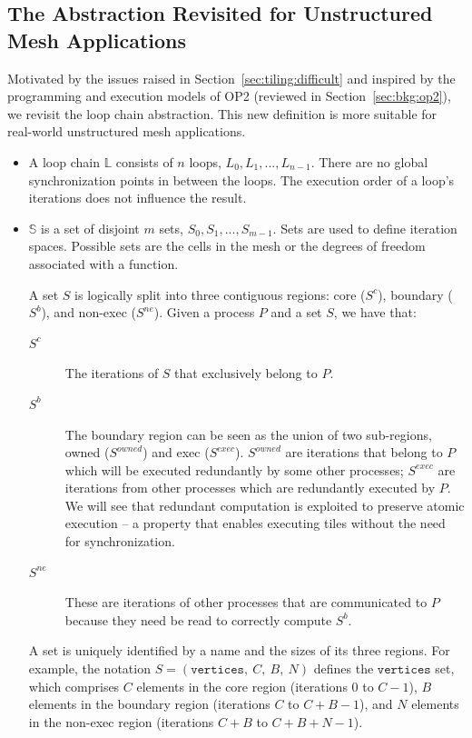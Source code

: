 \subsection{The Abstraction Revisited for Unstructured Mesh Applications}
\label{sec:tiling:lc-unstruct}
Motivated by the issues raised in Section~\ref{sec:tiling:difficult} and inspired by the programming and execution models of OP2 (reviewed in Section~\ref{sec:bkg:op2}), we revisit the loop chain abstraction. This new definition is more suitable for real-world unstructured mesh applications.

\begin{itemize}
\item A loop chain $\mathbb{L}$ consists of $n$ loops, $L_0, L_1, ..., L_{n-1}$. There are no global synchronization points in between the loops. The execution order of a loop's iterations does not influence the result. 

\item $\mathbb{S}$ is a set of disjoint $m$ sets, $S_0, S_1, ..., S_{m-1}$. Sets are used to define iteration spaces. Possible sets are the cells in the mesh or the degrees of freedom associated with a function.  

A set $S$ is logically split into three contiguous regions: core ($S^{c}$), boundary ($S^{b}$), and non-exec ($S^{ne}$). Given a process $P$ and a set $S$, we have that:
\begin{description}
 \item[$S^{c}$] The iterations of $S$ that exclusively belong to $P$.
 \item[$S^{b}$] The boundary region can be seen as the union of two sub-regions, owned ($S^{owned}$) and exec ($S^{exec}$). $S^{owned}$ are iterations that belong to $P$ which will be executed redundantly by some other processes; $S^{exec}$ are iterations from other processes which are redundantly executed by $P$. We will see that redundant computation is exploited to preserve atomic execution -- a property that enables executing tiles without the need for synchronization.
  \item[$S^{ne}$] These are iterations of other processes that are communicated to $P$ because they need be read to correctly compute $S^{b}$.
 \end{description} 
 
A set is uniquely identified by a name and the sizes of its three regions. For example, the notation $S = (\texttt{vertices},\ C,\ B,\ N)$ defines the $\texttt{vertices}$ set, which comprises $C$ elements in the core region (iterations $0$ to $C-1$), $B$ elements in the boundary region (iterations $C$ to $C+B-1$), and $N$ elements in the non-exec region (iterations $C+B$ to $C+B+N-1$).


\end{itemize}
